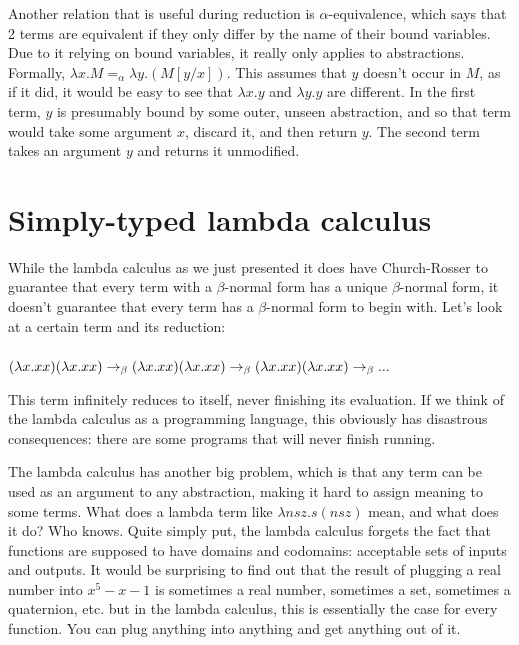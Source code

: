 \documentclass[12pt]{article}
\begin{document}
Another relation that is useful during reduction is $\alpha$-equivalence, which says that 2 terms are equivalent if they only differ by the name of their bound variables. Due to it relying on bound variables, it really only applies to abstractions. Formally, $\lambda x. M =_\alpha \lambda y.(M[y/x])$. This assumes that $y$ doesn't occur in $M$, as if it did, it would be easy to see that $\lambda x. y$ and $\lambda y. y$ are different. In the first term, $y$ is presumably bound by some outer, unseen abstraction, and so that term would take some argument $x$, discard it, and then return $y$. The second term takes an argument $y$ and returns it unmodified.

\section{Simply-typed lambda calculus}

While the lambda calculus as we just presented it does have Church-Rosser to guarantee that every term with a $\beta$-normal form has a unique $\beta$-normal form, it doesn't guarantee that every term has a $\beta$-normal form to begin with. Let's look at a certain term and its reduction: \\
\\
$(\lambda x. x x)(\lambda x. x x) \\
\to_\beta (\lambda x. x x) (\lambda x. x x) \\
\to_\beta (\lambda x. x x) (\lambda x. x x) \\
\to_\beta ... \\$

This term infinitely reduces to itself, never finishing its evaluation. If we think of the lambda calculus as a programming language, this obviously has disastrous consequences: there are some programs that will never finish running.

The lambda calculus has another big problem, which is that any term can be used as an argument to any abstraction, making it hard to assign meaning to some terms. What does a lambda term like $\lambda nsz.s(nsz)$ mean, and what does it do? Who knows. Quite simply put, the lambda calculus forgets the fact that functions are supposed to have domains and codomains: acceptable sets of inputs and outputs. It would be surprising to find out that the result of plugging a real number into $x^5 - x - 1$ is sometimes a real number, sometimes a set, sometimes a quaternion, etc. but in the lambda calculus, this is essentially the case for every function. You can plug anything into anything and get anything out of it.
\end{document}
